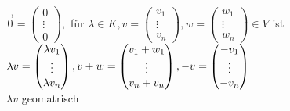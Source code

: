 \documentclass[a4paper,11pt]{article}
\begin{document}
$\overset{\rightarrow}{0}=\begin{pmatrix}0\\ \vdots \\0\end{pmatrix},$ für $\lambda\in K, v=\begin{pmatrix}v_1\\ \vdots \\v_n\end{pmatrix}, w=\begin{pmatrix}w_1\\ \vdots \\w_n\end{pmatrix}\in V$ ist $\lambda v =\begin{pmatrix}\lambda v_1\\\vdots\\\lambda v_n\end{pmatrix}, \\
v+w=\begin{pmatrix}v_1+w_1\\\vdots\\v_n+v_n\end{pmatrix}, -v=\begin{pmatrix}-v_1\\\vdots\\-v_n\end{pmatrix}$ \\
$\lambda v$ geomatrisch \\
\end{document}
